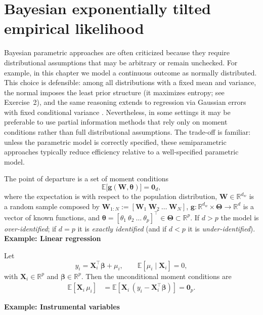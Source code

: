 \section{Bayesian exponentially tilted empirical likelihood}\label{sec12_9}

Bayesian parametric approaches are often criticized because they require distributional assumptions that may be arbitrary or remain unchecked. For example, in this chapter we model a continuous outcome as normally distributed. This choice is defensible: among all distributions with a fixed mean and variance, the normal imposes the least prior structure (it maximizes entropy; see Exercise~2), and the same reasoning extends to regression via Gaussian errors with fixed conditional variance \cite{zellner1996bmom}. Nevertheless, in some settings it may be preferable to use partial information methods that rely only on moment conditions rather than full distributional assumptions. The trade-off is familiar: unless the parametric model is correctly specified, these semiparametric approaches typically reduce efficiency relative to a well-specified parametric model.

The point of departure is a set of moment conditions
\[
\mathbb{E}\!\big[\mathbf{g}(\mathbf{W},\boldsymbol{\theta})\big]=\mathbf{0}_{d},
\]
where the expectation is with respect to the population distribution, $\mathbf{W}\in\mathbb{R}^{d_w}$ is a random sample composed by $\mathbf{W}_{1:N}:=[\mathbf{W}_1 \ \mathbf{W}_2 \ \dots \ \mathbf{W}_N]$, 
$\mathbf{g}:\mathbb{R}^{d_w}\times\boldsymbol{\Theta}\to\mathbb{R}^{d}$ is a vector of known functions, and 
$\boldsymbol{\theta}=[\theta_{1}\ \theta_{2}\ \dots\ \theta_{p}]^{\top}\in\boldsymbol{\Theta}\subset\mathbb{R}^{p}$.
If $d>p$ the model is \emph{over-identified}; if $d=p$ it is \emph{exactly identified} (and if $d<p$ it is \emph{under-identified}).\\

\textbf{Example: Linear regression}

Let
\[
y_i=\mathbf{X}_i^{\top}\boldsymbol{\beta}+\mu_i,\qquad \mathbb{E}[\mu_i\mid \mathbf{X}_i]=0,
\]
with $\mathbf{X}_i\in\mathbb{R}^{p}$ and $\boldsymbol{\beta}\in\mathbb{R}^{p}$. Then the unconditional moment conditions are
\begin{align*}
	\mathbb{E}\!\left[\mathbf{X}_i\,\mu_i\right]
	&=\mathbb{E}\!\left[\mathbf{X}_i\,(y_i-\mathbf{X}_i^{\top}\boldsymbol{\beta})\right]
	=\mathbf{0}_{p}.
\end{align*}

\textbf{Example: Instrumental variables}

